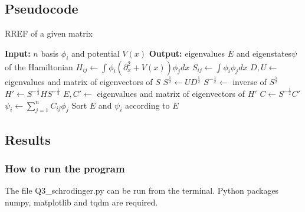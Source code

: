 \documentclass{article}
\begin{document}
\subsection{Pseudocode}
\begin{algorithm}[H]%
\caption{RREF of a given matrix}
    \begin{algorithmic}[1]%
        \Statex\textbf{Input:} $n$ basis {$\phi_i$} and potential $V(x)$
        \Statex\textbf{Output:} eigenvalues $E$ and eigenstates$\psi$ of the Hamiltonian
                \State $H_{ij}\gets\int\phi_i(\partial_x^2 + V(x))\phi_jdx$
                \State $S_{ij}\gets\int\phi_i\phi_jdx$
            \EndFor
        \EndFor
        \State $D, U\gets$ eigenvalues and matrix of eigenvectors of $S$
        \State $S^{\frac{1}{2}}\gets UD^{\frac{1}{2}}$
        \State $S^{-\frac{1}{2}}\gets $ inverse of $S^{\frac{1}{2}}$
        \State $H'\gets S^{-\frac{1}{2}} HS^{-\frac{1}{2}}$
        \State $E, C'\gets$ eigenvalues and matrix of eigenvectors of $H'$
        \State $C\gets S^{-\frac{1}{2}} C'$
        \State $\psi_i\gets\sum_{j=1}^n C_{ij}\phi_j$
        \State Sort $E$ and $\psi_i$ according to $E$
    \end{algorithmic}
\end{algorithm}

\subsection{Results}
\subsubsection{How to run the program}
The file Q3\_schrodinger.py can be run from the terminal. Python packages numpy, matplotlib and tqdm are required.
\end{document}
